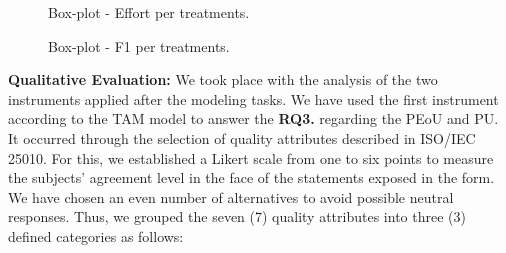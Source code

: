 \begin{figure}[!htb]
        \centering
        \caption{Box-plot - Effort per treatments.}
        \label{fig:boxplotTempo1}
        
\end{figure}


\begin{figure}[!htb]
        \centering
        \caption{Box-plot - F1 per treatments.}
        \label{fig:boxplotMedidaF1}
        
\end{figure}

%     

\textbf{Qualitative Evaluation:} 
We took place with the analysis of the two instruments applied after the modeling tasks.
We have used the first instrument according to the TAM model \cite{Davis:1989,Persico:2014} to answer the \textbf{RQ3.} regarding the PEoU and PU.
It occurred through the selection of quality attributes described in ISO/IEC 25010.
For this, we established a Likert \cite{Likert} scale from one to six points to measure the subjects' agreement level in the face of the statements exposed in the form.
We have chosen an even number of alternatives to avoid possible neutral responses.
Thus, we grouped the seven (7) quality attributes into three (3) defined categories as follows:

